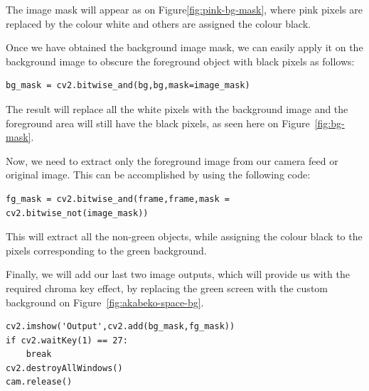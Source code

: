 \documentclass{labo}
\begin{document}
The image mask will appear as on Figure\ref{fig:pink-bg-mask}, where pink pixels are replaced by the colour white and others are assigned the colour black.


Once we have obtained the background image mask, we can easily apply it on the background image to obscure the foreground object with black pixels as follows:
\begin{verbatim}
bg_mask = cv2.bitwise_and(bg,bg,mask=image_mask)
\end{verbatim}

The result will replace all the white pixels with the background image and the foreground area will still have the black pixels, as seen here on Figure~\ref{fig:bg-mask}.


Now, we need to extract only the foreground image from our camera feed or original image. This can be accomplished by using the following code:
\begin{verbatim}
fg_mask = cv2.bitwise_and(frame,frame,mask = cv2.bitwise_not(image_mask))
\end{verbatim}
This will extract all the non-green objects, while assigning the colour black to the pixels corresponding to the green background.

Finally, we will add our last two image outputs, which will provide us with the required chroma key effect, by replacing the green screen with the custom background on Figure~\ref{fig:akabeko-space-bg}.
\begin{verbatim}
cv2.imshow('Output',cv2.add(bg_mask,fg_mask))
if cv2.waitKey(1) == 27:
	break
cv2.destroyAllWindows()
cam.release()
\end{verbatim}
\end{document}
